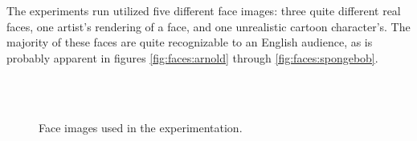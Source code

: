 The experiments run utilized five different face images: three quite different real faces, one artist's rendering of a face, and one unrealistic cartoon character's. The majority of these faces are quite recognizable to an English audience, as is probably apparent in figures \ref{fig:faces:arnold} through \ref{fig:faces:spongebob}.

\begin{figure}
    \centering
     \\
     \\
    \caption{Face images used in the experimentation.\label{fig:faces}}
\end{figure}

